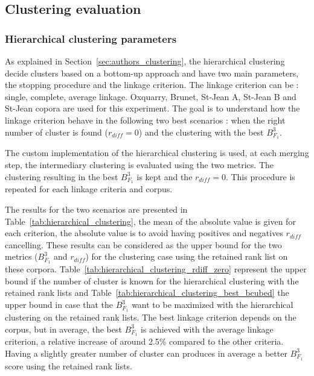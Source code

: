 \subsection{Clustering evaluation}

\subsubsection{Hierarchical clustering parameters \label{sec:hierarchical_clustering}}

As explained in Section~\ref{sec:authors_clustering}, the hierarchical clustering decide clusters based on a bottom-up approach and have two main parameters, the stopping procedure and the linkage criterion.
The linkage criterion can be : single, complete, average linkage.
Oxquarry, Brunet, St-Jean A, St-Jean B and St-Jean copora are used for this experiment.
The goal is to understand how the linkage criterion behave in the following two best scenarios : when the right number of cluster is found ($r_{diff} = 0$) and the clustering with the best $B^3_{F_1}$.

The custom implementation of the hierarchical clustering is used, at each merging step, the intermediary clustering is evaluated using the two metrics.
The clustering resulting in the best $B^3_{F_1}$ is kept and the $r_{diff} = 0$.
This procedure is repeated for each linkage criteria and corpus.

The results for the two scenarios are presented in Table~\ref{tab:hierarchical_clustering}, the mean of the absolute value is given for each criterion, the absolute value is to avoid having positives and negatives $r_{diff}$ cancelling.
These results can be considered as the upper bound for the two metrics ($B^3_{F_1}$ and $r_{diff}$) for the clustering case using the retained rank list on these corpora.
Table~\ref{tab:hierarchical_clustering_rdiff_zero} represent the upper bound if the number of cluster is known for the hierarchical clustering with the retained rank lists and Table~\ref{tab:hierarchical_clustering_best_bcubed} the upper bound in case that the $B^3_{F_1}$ want to be maximized with the hierarchical clustering on the retained rank lists.
The best linkage criterion depends on the corpus, but in average, the best $B^3_{F_1}$ is achieved with the average linkage criterion, a relative increase of around 2.5\% compared to the other criteria.
Having a slightly greater number of cluster can produces in average a better $B^3_{F_1}$ score using the retained rank lists.

